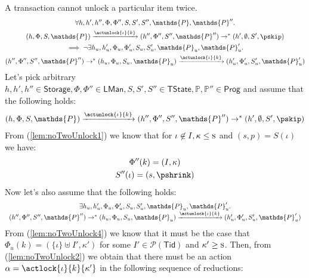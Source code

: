 \begin{lem}
	\label{lem:noTwoUnlock}
	A transaction cannot unlock a particular item twice.
	\begin{gather*}
		\forall h, h', h'', \Phi, \Phi'', S, S', S'', \mathds{P}, \mathds{P}'' \ldotp \\
		(h, \Phi, S, \mathds{P})
			\xrightarrow{\actunlock{\iota}{k}}
		(h'', \Phi'', S'', \mathds{P}'')
			\rightarrow^*
		(h', \emptyset, S', \pskip) \\
			\implies
		\lnot \exists h_u, h_u', \Phi_u, \Phi_u', S_u, S_u', \mathds{P}_u, \mathds{P}_u'
			\ldotp \\
		(h'', \Phi'', S'', \mathds{P}'')
			\rightarrow^*
		(h_u, \Phi_u, S_u, \mathds{P}_u)
			\xrightarrow{\actunlock{\iota}{k}}
		(h_u', \Phi_u', S_u', \mathds{P}_u')
	\end{gather*}
	Let's pick arbitrary $h, h', h'' \in \mathsf{Storage}, \Phi, \Phi'' \in \mathsf{LMan}, S, S', S'' \in \mathsf{TState}, \mathds{P}, \mathds{P}'' \in \mathsf{Prog}$ and assume that the following holds:
	\begin{gather}
		\label{lem:noTwoUnlock1}
		(h, \Phi, S, \mathds{P})
			\xrightarrow{\actunlock{\iota}{k}}
		(h'', \Phi'', S'', \mathds{P}'')
			\rightarrow^*
		(h', \emptyset, S', \pskip)
	\end{gather}
	From (\ref{lem:noTwoUnlock1}) we know that for $\iota \not\in I, \kappa \leq \textsc{s}$ and $(s, p) = S(\iota)$ we have:
	\begin{gather}
		\label{lem:noTwoUnlock2}
		\Phi''(k) = (I, \kappa) \\
		\label{lem:noTwoUnlock3}
		S''(\iota) = (s, \pshrink)
	\end{gather}
	Now let's also assume that the following holds:
	\begin{gather}
		\label{lem:noTwoUnlock4}
		\begin{array}{c}
			\exists h_u, h_u', \Phi_u, \Phi_u', S_u, S_u', \mathds{P}_u, \mathds{P}_u'
				\ldotp \\
			(h'', \Phi'', S'', \mathds{P}'')
				\rightarrow^*
			(h_u, \Phi_u, S_u, \mathds{P}_u)
				\xrightarrow{\actunlock{\iota}{k}}
			(h_u', \Phi_u', S_u', \mathds{P}_u')
		\end{array}
	\end{gather}
	From (\ref{lem:noTwoUnlock4}) we know that it must be the case that $\Phi_u(k) = (\{\iota\} \uplus I', \kappa')$ for some $I' \in \mathcal{P}(\mathsf{Tid})$ and $\kappa' \geq \textsc{s}$. Then, from (\ref{lem:noTwoUnlock2}) we obtain that there must be an action $\alpha = \actlock{\iota}{k}{\kappa'}$ in the following sequence of reductions:

\end{lem}
